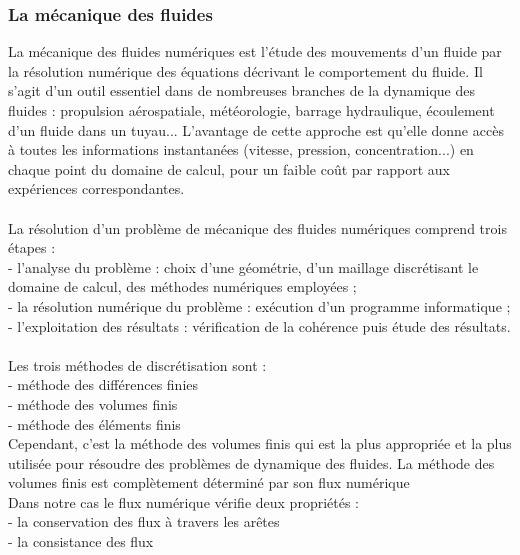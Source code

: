 \documentclass[12pt]{article}
\begin{document}
\subsubsection{La mécanique des fluides}
\noindent La mécanique des fluides numériques est l'étude des mouvements d'un fluide par la résolution numérique des équations décrivant le comportement du fluide. Il s'agit d'un outil essentiel dans de nombreuses branches de la dynamique des fluides : propulsion aérospatiale, météorologie, barrage hydraulique, écoulement d'un fluide dans un tuyau... L'avantage de cette approche est qu'elle donne accès à toutes les informations instantanées (vitesse, pression, concentration...) en chaque point du domaine de calcul, pour un faible coût par rapport aux expériences correspondantes. 
\\
\\La résolution d'un problème de mécanique des fluides numériques comprend trois étapes :
\\- l'analyse du problème : choix d'une géométrie, d'un maillage discrétisant le domaine de calcul, des méthodes numériques employées ;
\\- la résolution numérique du problème : exécution d'un programme informatique ;
\\- l'exploitation des résultats : vérification de la cohérence puis étude des résultats.
\\
\\Les trois méthodes de discrétisation sont :
\\- méthode des différences finies
\\- méthode des volumes finis
\\- méthode des éléments finis
\\Cependant, c'est la méthode des volumes finis qui est la plus appropriée et la plus utilisée pour résoudre des problèmes de dynamique des fluides.
La méthode des volumes finis est complètement déterminé par son flux numérique\\

\noindent Dans notre cas le flux numérique vérifie deux propriétés :
\\- la conservation des flux à travers les arêtes
\\ - la consistance des flux
\\
\end{document}
